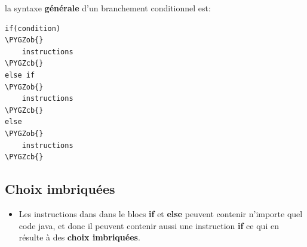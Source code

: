\documentclass[letterpaper,10pt,english]{sphinxmanual}
\def\PYGZob{\char`\{}
\def\PYGZcb{\char`\}}
\begin{document}
la syntaxe \textbf{générale} d'un branchement conditionnel est:

\begin{Verbatim}[commandchars=\\\{\}]
if(condition)
\PYGZob{}
    instructions
\PYGZcb{}
else if
\PYGZob{}
    instructions
\PYGZcb{}
else
\PYGZob{}
    instructions
\PYGZcb{}
\end{Verbatim}


\subsection{Choix imbriquées}
\label{structures1:choix-imbriquees}\begin{itemize}
\item {} 
Les instructions dans dans le blocs \textbf{if} et \textbf{else} peuvent contenir n'importe quel code java, et donc il peuvent contenir aussi une instruction \textbf{if} ce qui en résulte à des \textbf{choix imbriquées}.

\end{itemize}
\end{document}
